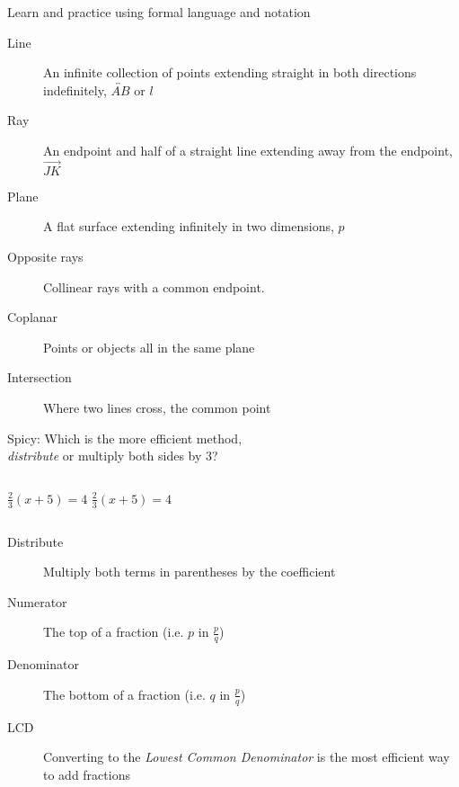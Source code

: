 \begin{frame}{Learn and practice using formal language and notation}
  \begin{description}%
    \item[Line] An infinite collection of points extending straight in both directions indefinitely, $\overleftrightarrow{AB}$ or $l$
    \item[Ray] An endpoint and half of a straight line extending away from the endpoint, $\overrightarrow{JK}$
    \item[Plane] A flat surface extending infinitely in two dimensions, $p$
    \item[Opposite rays] Collinear rays with a common endpoint. 
    \item[Coplanar] Points or objects all in the same plane
    \item[Intersection] Where two lines cross, the common point
  \end{description}
\end{frame}

\begin{frame}{Spicy: Which is the more efficient method, \\ \qquad \emph{distribute} or multiply both sides by 3?}
  \begin{columns}[c]
     $\frac{2}{3}(x+5)=4$
     $\frac{2}{3}(x+5)=4$
  \end{columns} \vspace{3cm}
  \begin{description}
    \item[Distribute] Multiply both terms in parentheses by the coefficient
    \item[Numerator] The top of a fraction (i.e. $p$ in $\frac{p}{q}$)
    \item[Denominator] The bottom of a fraction (i.e. $q$ in $\frac{p}{q}$)
    \item[LCD] Converting to the \emph{Lowest Common Denominator} is the most efficient way to add fractions
  \end{description}
\end{frame}

